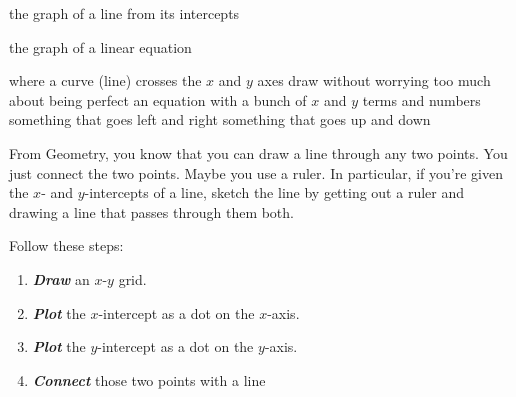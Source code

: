 \documentclass[fleqn,letterpaper,12pt,printwatermark=false]{memoir}
\begin{document}
\newcommand{\myClassName}{Pre-AP Algebra 2}
\newcommand{\myUnitNumber}{1}
\newcommand{\myUnitTitle}{Introduction to Functions}
\newcommand{\myLessonNumber}{7}
\newcommand{\myLessonTitle}{Graphing Linear Equations}



\pagestyle{myPagestyle}

\checkandfixthelayout
{}

\begin{myNotesHeader}
    \item {} the graph of a line from its intercepts
    \item {} the graph of a linear equation
\end{myNotesHeader}

\begin{myVocabulary}
        {
            where a curve (line) crosses the $x$ and $y$ axes
        }
        {
            draw without worrying too much about being perfect
        }
        {
            an equation with a bunch of $x$ and $y$ terms and numbers
        }
        {
            something that goes left and right
        }
        {
            something that goes up and down
        }
\end{myVocabulary}

\begin{myLesson}[][1]
    From Geometry, you know that 
    you can draw a line through any two points.
    You just connect the two points.
    Maybe you use a ruler.
    In particular, if you're given the $x$- and $y$-intercepts
    of a line, sketch the line 
    by getting out a ruler and drawing a line that passes 
    through them both.
\end{myLesson}

\begin{myKeyConcepts}
    Follow these steps:
    \begin{enumerate}
        \item {\bfseries\itshape Draw} an $x$-$y$ grid.
        \item {\bfseries\itshape Plot} the $x$-intercept as a dot on the $x$-axis.
        \item {\bfseries\itshape Plot} the $y$-intercept as a dot on the $y$-axis.
        \item {\bfseries\itshape Connect} those two points with a line
    \end{enumerate}
\end{myKeyConcepts}
\end{document}
